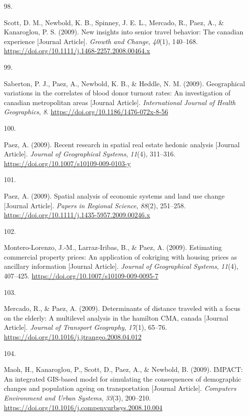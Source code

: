 \documentclass[11pt,a4paper,]{awesome-cv}
\newlength{\csllabelwidth}
\newcommand{\CSLLeftMargin}[1]{\parbox[t]{\csllabelwidth}{#1}}
\newcommand{\CSLRightInline}[1]{\parbox[t]{\linewidth - \csllabelwidth}{#1}}
\begin{document}
\leavevmode{}%
\CSLLeftMargin{98. }
\CSLRightInline{Scott, D. M., Newbold, K. B., Spinney, J. E. L.,
Mercado, R., Paez, A., \& Kanaroglou, P. S. (2009). New insights into
senior travel behavior: The canadian experience {[}Journal Article{]}.
\emph{Growth and Change}, \emph{40}(1), 140--168.
\url{https://doi.org/10.1111/j.1468-2257.2008.00464.x}}

\leavevmode{}%
\CSLLeftMargin{99. }
\CSLRightInline{Saberton, P. J., Paez, A., Newbold, K. B., \& Heddle, N.
M. (2009). Geographical variations in the correlates of blood donor
turnout rates: An investigation of canadian metropolitan areas
{[}Journal Article{]}. \emph{International Journal of Health
Geographics}, \emph{8}. \url{https://doi.org/10.1186/1476-072x-8-56}}

\leavevmode{}%
\CSLLeftMargin{100. }
\CSLRightInline{Paez, A. (2009). Recent research in spatial real estate
hedonic analysis {[}Journal Article{]}. \emph{Journal of Geographical
Systems}, \emph{11}(4), 311--316.
\url{https://doi.org/10.1007/s10109-009-0103-y}}

\leavevmode{}%
\CSLLeftMargin{101. }
\CSLRightInline{Paez, A. (2009). Spatial analysis of economic systems
and land use change {[}Journal Article{]}. \emph{Papers in Regional
Science}, \emph{88}(2), 251--258.
\url{https://doi.org/10.1111/j.1435-5957.2009.00246.x}}

\leavevmode{}%
\CSLLeftMargin{102. }
\CSLRightInline{Montero-Lorenzo, J.-M., Larraz-Iribas, B., \& Paez, A.
(2009). Estimating commercial property prices: An application of
cokriging with housing prices as ancillary information {[}Journal
Article{]}. \emph{Journal of Geographical Systems}, \emph{11}(4),
407--425. \url{https://doi.org/10.1007/s10109-009-0095-7}}

\leavevmode{}%
\CSLLeftMargin{103. }
\CSLRightInline{Mercado, R., \& Paez, A. (2009). Determinants of
distance traveled with a focus on the elderly: A multilevel analysis in
the hamilton CMA, canada {[}Journal Article{]}. \emph{Journal of
Transport Geography}, \emph{17}(1), 65--76.
\url{https://doi.org/10.1016/j.jtrangeo.2008.04.012}}

\leavevmode{}%
\CSLLeftMargin{104. }
\CSLRightInline{Maoh, H., Kanaroglou, P., Scott, D., Paez, A., \&
Newbold, B. (2009). IMPACT: An integrated GIS-based model for simulating
the consequences of demographic changes and population ageing on
transportation {[}Journal Article{]}. \emph{Computers Environment and
Urban Systems}, \emph{33}(3), 200--210.
\url{https://doi.org/10.1016/j.compenvurbsys.2008.10.004}}
\end{document}

